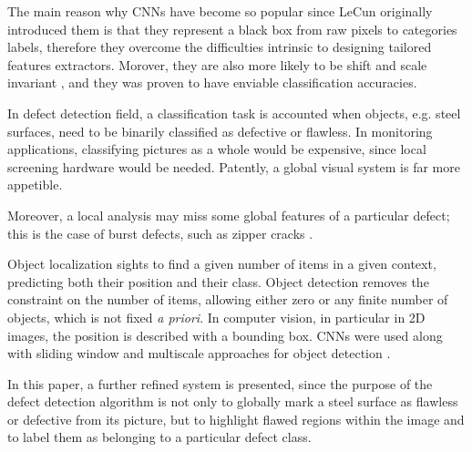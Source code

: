     \par{
        The main reason why CNNs have become so popular since LeCun originally introduced them \cite{nips:NIPS1989_293, ieee:726791, LeCun:1999:ORG:646469.691875, researchgate:deeplearning} is that they represent a black box from raw pixels to categories labels, therefore they overcome the difficulties intrinsic to designing tailored features extractors. Morover, they are also more likely to be shift and scale invariant \cite{LeCun:1999:ORG:646469.691875}, and they was proven to have enviable classification accuracies.
    }
    \par{
        In defect detection field, a classification task is accounted when objects, e.g. steel surfaces, need to be binarily classified as defective or flawless. In monitoring applications, classifying pictures as a whole would be expensive, since local screening hardware would be needed. Patently, a global visual system is far more appetible. 
    }
    \par{
        Moreover, a local analysis may miss some global features of a particular defect; this is the case of burst defects, such as zipper cracks \cite{defects:mainlinemetals}.
    }
    \par{
        Object localization sights to find a given number of items in a given context, predicting both their position and their class. Object detection removes the constraint on the number of items, allowing either zero or any finite number of objects, which is not fixed \emph{a priori}. In computer vision, in particular in 2D images, the position is described with a bounding box. CNNs were used along with sliding window and multiscale approaches for object detection \cite{ieee:7410526, ieee:7532516, arXiv:1312.6229S}.
    }
    \par{
        In this paper, a further refined system is presented, since the purpose of the defect detection algorithm is not only to globally mark a steel surface as flawless or defective from its picture, but to highlight flawed regions within the image and to label them as belonging to a particular defect class.
    }
